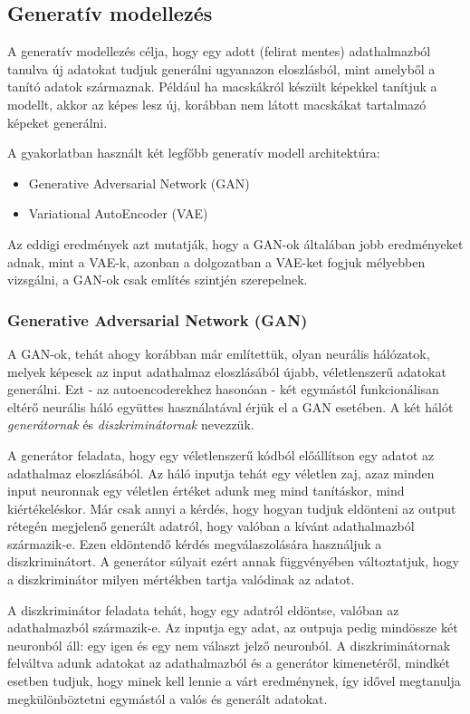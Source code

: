 \documentclass[12pt]{article}
\begin{document}
\subsection{Generatív modellezés}

A generatív modellezés célja, hogy egy adott (felirat mentes) adathalmazból tanulva új adatokat tudjuk generálni ugyanazon eloszlásból, mint amelyből a tanító adatok származnak. Például ha macskákról készült képekkel tanítjuk a modellt, akkor az képes lesz új, korábban nem látott macskákat tartalmazó képeket generálni.

A gyakorlatban használt két legfőbb generatív modell architektúra:
\begin{itemize}
  \item Generative Adversarial Network (GAN)
  \item Variational AutoEncoder (VAE)
\end{itemize}

Az eddigi eredmények azt mutatják, hogy a GAN-ok általában jobb eredményeket adnak, mint a VAE-k, azonban a dolgozatban a VAE-ket fogjuk mélyebben vizsgálni, a GAN-ok csak említés szintjén szerepelnek.

\subsubsection{Generative Adversarial Network (GAN)}

A GAN-ok, tehát ahogy korábban már említettük, olyan neurális hálózatok, melyek képesek az input adathalmaz eloszlásából újabb, véletlenszerű adatokat generálni. Ezt - az autoencoderekhez hasonóan - két egymástól funkcionálisan eltérő neurális háló együttes használatával érjük el a GAN esetében. A két hálót \textit{generátornak} és \textit{diszkriminátornak} nevezzük.

A generátor feladata, hogy egy véletlenszerű kódból előállítson egy adatot az adathalmaz eloszlásából. Az háló inputja tehát egy véletlen zaj, azaz minden input neuronnak egy véletlen értéket adunk meg mind tanításkor, mind kiértékeléskor. Már csak annyi a kérdés, hogy hogyan tudjuk eldönteni az output rétegén megjelenő generált adatról, hogy valóban a kívánt adathalmazból származik-e. Ezen eldöntendő kérdés megválaszolására használjuk a diszkriminátort. A generátor súlyait ezért annak függvényében változtatjuk, hogy a diszkriminátor milyen mértékben tartja valódinak az adatot.

A diszkriminátor feladata tehát, hogy egy adatról eldöntse, valóban az adathalmazból származik-e. Az inputja egy adat, az outpuja pedig mindössze két neuronból áll: egy igen és egy nem választ jelző neuronból. A diszkriminátornak felváltva adunk adatokat az adathalmazból és a generátor kimenetéről, mindkét esetben tudjuk, hogy minek kell lennie a várt eredménynek, így idővel megtanulja megkülönböztetni egymástól a valós és generált adatokat. 
\end{document}
